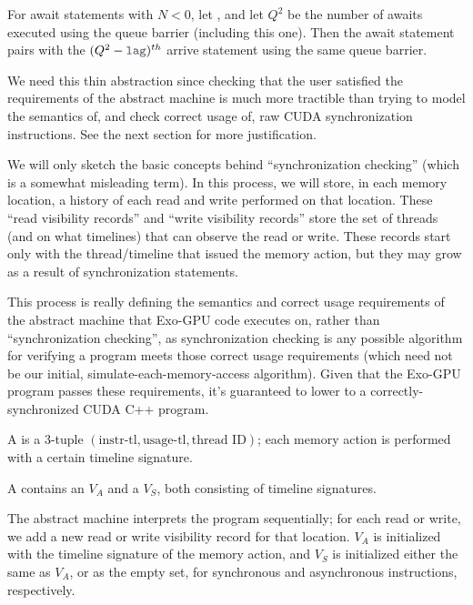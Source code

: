 \filbreak
For await statements with $N < 0$, let , and let $Q^2$ be the number of awaits executed using the queue barrier (including this one).
Then the await statement pairs with the $(Q^2 - \lighttt{lag})^{th}$ arrive statement using the same queue barrier.

\filbreak
{} We need this thin abstraction since checking that the user satisfied the requirements of the abstract machine is much more tractible than trying to model the semantics of, and check correct usage of, raw CUDA synchronization instructions. See the next section for more justification.

\filbreak
{}

We will only sketch the basic concepts behind ``synchronization checking'' (which is a somewhat misleading term).
In this process, we will store, in each memory location, a history of each read and write performed on that location.
These ``read visibility records'' and ``write visibility records'' store the set of threads (and on what timelines) that can observe the read or write.
These records start only with the thread/timeline that issued the memory action, but they may grow as a result of synchronization statements.

\filbreak
This process is really defining the semantics and correct usage requirements of the abstract machine that Exo-GPU code executes on, rather than ``synchronization checking'', as synchronization checking is any possible algorithm for verifying a program meets those correct usage requirements (which need not be our initial, simulate-each-memory-access algorithm).
Given that the Exo-GPU program passes these requirements, it's guaranteed to lower to a correctly-synchronized CUDA C++ program.

\filbreak
A  is a 3-tuple $(\text{instr-tl}, \text{usage-tl}, \text{thread ID})$; each memory action is performed with a certain timeline signature.

\filbreak  
A  contains an  $V_A$ and a  $V_S$, both consisting of timeline signatures.

\filbreak
The abstract machine interprets the program sequentially; for each read or write, we add a new read or write visibility record for that location.
$V_A$ is initialized with the timeline signature of the memory action, and $V_S$ is initialized either the same as $V_A$, or as the empty set, for synchronous and asynchronous instructions, respectively.


